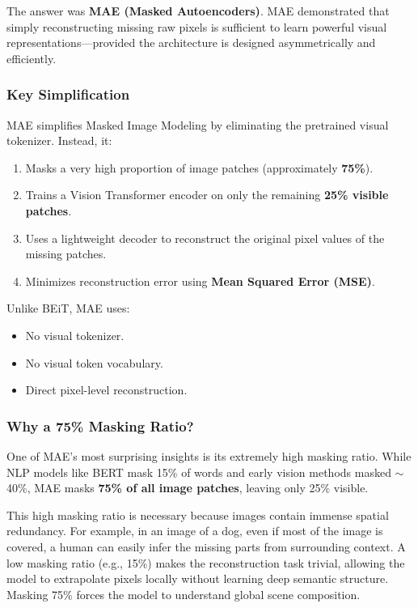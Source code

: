 The answer was \textbf{MAE (Masked Autoencoders)}. MAE demonstrated that simply reconstructing missing raw pixels is sufficient to learn powerful visual representations—provided the architecture is designed asymmetrically and efficiently.

\subsubsection{Key Simplification}

MAE simplifies Masked Image Modeling by eliminating the pretrained visual tokenizer. Instead, it:
\begin{enumerate}
    \item Masks a very high proportion of image patches (approximately \textbf{75\%}).
    \item Trains a Vision Transformer encoder on only the remaining \textbf{25\% visible patches}.
    \item Uses a lightweight decoder to reconstruct the original pixel values of the missing patches.
    \item Minimizes reconstruction error using \textbf{Mean Squared Error (MSE)}.
\end{enumerate}

Unlike BEiT, MAE uses:
\begin{itemize}
    \item No visual tokenizer.
    \item No visual token vocabulary.
    \item Direct pixel-level reconstruction.
\end{itemize}

\subsubsection{Why a 75\% Masking Ratio?}

One of MAE's most surprising insights is its extremely high masking ratio. While NLP models like BERT mask 15\% of words and early vision methods masked $\sim$40\%, MAE masks \textbf{75\% of all image patches}, leaving only 25\% visible.


This high masking ratio is necessary because images contain immense spatial redundancy. For example, in an image of a dog, even if most of the image is covered, a human can easily infer the missing parts from surrounding context. A low masking ratio (e.g., 15\%) makes the reconstruction task trivial, allowing the model to extrapolate pixels locally without learning deep semantic structure. Masking 75\% forces the model to understand global scene composition.

